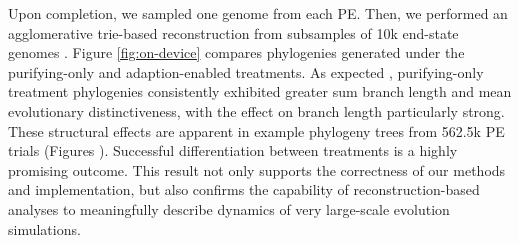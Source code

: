 Upon completion, we sampled one genome from each PE.
Then, we performed an agglomerative trie-based reconstruction from subsamples of 10k end-state genomes \citep{moreno2024analysis}.
Figure \ref{fig:on-device} compares phylogenies generated under the purifying-only and adaption-enabled treatments.
As expected \citep{moreno2023toward}, purifying-only treatment phylogenies consistently exhibited greater sum branch length and mean evolutionary distinctiveness, with the effect on branch length particularly strong.
These structural effects are apparent in example phylogeny trees from 562.5k PE trials (Figures ).
Successful differentiation between treatments is a highly promising outcome.
This result not only supports the correctness of our methods and implementation, but also confirms the capability of reconstruction-based analyses to meaningfully describe dynamics of very large-scale evolution simulations.
